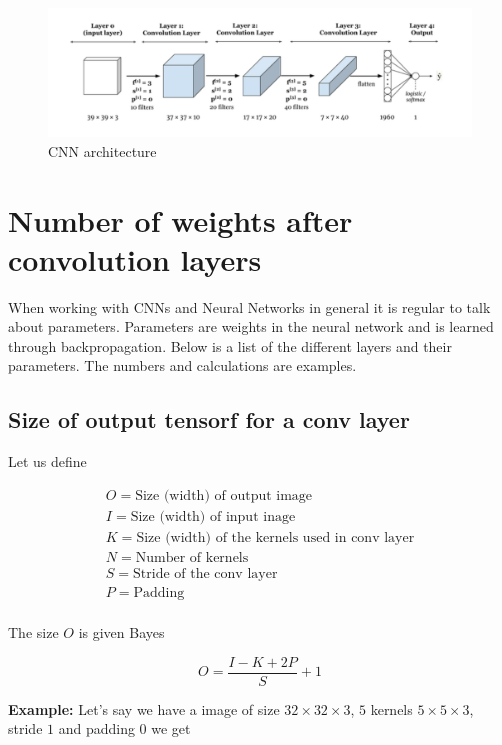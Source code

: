 \begin{figure}[H]
    \centering
    \includegraphics[width=\linewidth]{figures/CNN.PNG}
    \caption{CNN architecture}
\end{figure}

\section{Number of weights after convolution layers}

When working with CNNs and Neural Networks in general it is regular to talk
about parameters. Parameters are weights in the neural network and is learned
through backpropagation. Below is a list of the different layers and their
parameters. The numbers and calculations are examples.

\subsection{Size of output tensorf for a conv layer}

Let us define

\begin{gather*}
    O = \text{Size (width) of output image} \\
    I = \text{Size (width) of input inage} \\
    K = \text{Size (width) of the kernels used in conv layer} \\
    N = \text{Number of kernels} \\
    S = \text{Stride of the conv layer} \\
    P = \text{Padding} \\
\end{gather*}

The size $O$ is given Bayes

\begin{equation}
    O = \frac{I - K + 2P}{S} + 1
\end{equation}

\textbf{Example:} Let's say we have a image of size $32 \times 32 \times 3$,
 $5$ kernels $5 \times 5 \times 3$, stride $1$ and padding $0$ we get

